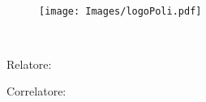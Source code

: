 

\begin{titlepage}
    \begin{center}
    	\large
        \spacedlowsmallcaps{\myUni} \\
        \bigskip\myFaculty \\
        \medskip\mySchool \\
    	\medskip\myDepartment \\
    	\bigskip\myCourseFirstPartIT \\
        \medskip\myCourseSecondPartIT \\  

        \hfill

        \vfill
        
        \begin{figure}[!h]
			\begin{center}
				\texttt{[image: Images/logoPoli.pdf]}
			\end{center}
		\end{figure}
		
		\vfill

        \begingroup
       		\huge	
            \color{Maroon} \myTitleIT \\ \bigskip
        \endgroup

        \vfill

		\flushleft 
		\normalsize{Relatore:}\\
		\medskip\spacedlowsmallcaps{\mySupervisor}

		\flushleft
		\normalsize{Correlatore:}\\
		\medskip\spacedlowsmallcaps{\myOtherSupervisor}\\
        
        \vfill  
        

\end{center}
\end{titlepage}
